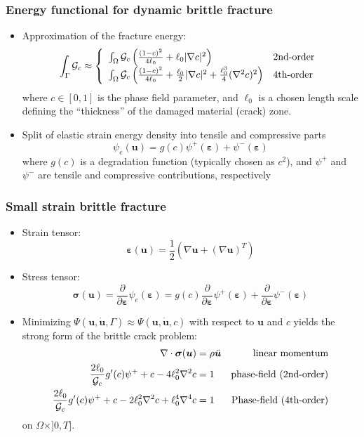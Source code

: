 \documentclass{beamer}
\begin{document}
\begin{frame}
  \frametitle{Energy functional for dynamic brittle fracture}

  \begin{itemize}
  \item Approximation of the fracture energy:
    \[
      \int_\Gamma {\cal G}_c \approx
      \left\{
        \begin{array}{ll}
          \int_\Omega {\cal G}_c\left(
          \frac{(1-c)^2}{4\ell_0} + \ell_0|\nabla c|^2 \right) & \mbox{2nd-order} \\
          \int_\Omega {\cal G}_c\left(
          \frac{(1-c)^2}{4\ell_0} + \frac{\ell_0}{2}|\nabla c|^2
          + \frac{\ell_0^3}{4}(\nabla^2c)^2 \right) & \mbox{4th-order}
        \end{array}
      \right.
    \]
    where $c\in[0,1]$ is the phase field parameter,
    and $\ell_0$ is a chosen length scale defining the ``thickness''
    of the damaged material (crack) zone.
  \item Split of elastic strain energy density into tensile and compressive parts
    \[
      \psi_e(\bm{u}) = g(c)\psi^+(\bm{\varepsilon}) + \psi^-(\bm{\varepsilon})
    \]
    where $g(c)$ is a degradation function (typically chosen as $c^2$), and
    $\psi^+$ and $\psi^-$ are tensile and compressive contributions, respectively
  \end{itemize}
\end{frame}

\begin{frame}
  \frametitle{Small strain brittle fracture}

  \begin{itemize}
  \item Strain tensor:
    \[
      \bm{\varepsilon}(\bm{u}) = \frac{1}{2}\left(\nabla\bm{u} + (\nabla\bm{u})^T\right)
    \]
  \item Stress tensor:
    \[
      \bm{\sigma}(\bm{u}) =
      \frac{\partial}{\partial\bm{\varepsilon}}\psi_e(\bm{\varepsilon}) =
      g(c)\frac{\partial}{\partial\bm{\varepsilon}}\psi^+(\bm{\varepsilon}) +
      \frac{\partial}{\partial\bm{\varepsilon}}\psi^-(\bm{\varepsilon})
    \]
  \item Minimizing
    $\Psi(\bm{u},\dot{\bm{u}},\Gamma)\approx\Psi(\bm{u},\dot{\bm{u}},c)$
    with respect to $\bm{u}$ and $c$ yields the strong form of the
    brittle crack problem:
    \begin{align*}
      \nabla\cdot\bm{\sigma}(\bm{u}) &= \rho\ddot{\bm{u}} & \text{linear momentum} \\
      \frac{2\ell_0}{{\cal G}_c}g'(c)\psi^+ + c - 4\ell_0^2\nabla^2c &= 1 & \text{phase-field (2nd-order)} \\
      \frac{2\ell_0}{{\cal G}_c}g'(c)\psi^+ + c - 2\ell_0^2\nabla^2c + \ell_0^4\nabla^4c &= 1 & \text{Phase-field (4th-order)}
    \end{align*}
    on $\Omega\times]0,T]$.
  \end{itemize}
\end{frame}
\end{document}
